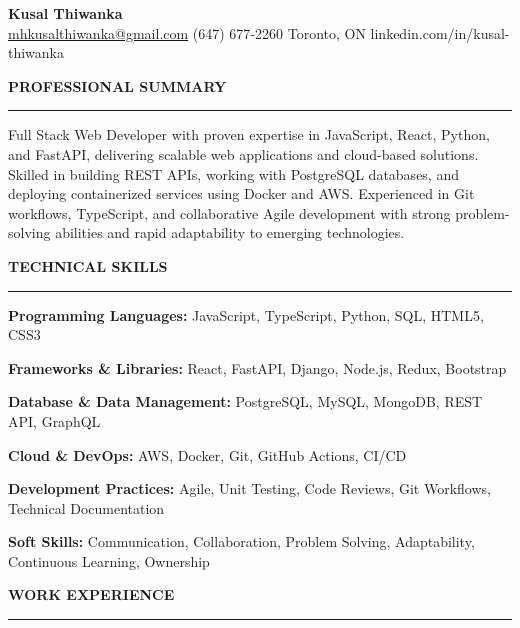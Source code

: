 \documentclass[10pt,letterpaper]{article}
\begin{document}
\begin{center}
{\LARGE\textbf{Kusal Thiwanka}}\\[3pt]
\href{mailto:mhkusalthiwanka@gmail.com}{mhkusalthiwanka@gmail.com}\hspace{2em}%
(647) 677{-}2260\hspace{2em}%
Toronto, ON\hspace{2em}
linkedin.com/in/kusal-thiwanka
\end{center}

\vspace{6pt}

\textbf{PROFESSIONAL SUMMARY}\\[-8pt]
\noindent\rule{\textwidth}{1pt}

\vspace{-2pt}

Full Stack Web Developer with proven expertise in JavaScript, React, Python, and FastAPI, delivering scalable web applications and cloud-based solutions. Skilled in building REST APIs, working with PostgreSQL databases, and deploying containerized services using Docker and AWS. Experienced in Git workflows, TypeScript, and collaborative Agile development with strong problem-solving abilities and rapid adaptability to emerging technologies.

\vspace{8pt}

\textbf{TECHNICAL SKILLS}\\[-8pt]
\noindent\rule{\textwidth}{1pt}

\vspace{-2pt}

\textbf{Programming Languages:} JavaScript, TypeScript, Python, SQL, HTML5, CSS3

\textbf{Frameworks \& Libraries:} React, FastAPI, Django, Node.js, Redux, Bootstrap

\textbf{Database \& Data Management:} PostgreSQL, MySQL, MongoDB, REST API, GraphQL

\textbf{Cloud \& DevOps:} AWS, Docker, Git, GitHub Actions, CI/CD

\textbf{Development Practices:} Agile, Unit Testing, Code Reviews, Git Workflows, Technical Documentation

\textbf{Soft Skills:} Communication, Collaboration, Problem Solving, Adaptability, Continuous Learning, Ownership

\vspace{8pt}

\textbf{WORK EXPERIENCE}\\[-8pt]
\noindent\rule{\textwidth}{1pt}
\end{document}
